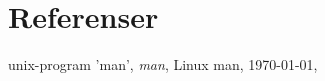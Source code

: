 \section{Referenser}
\begin{thebibliography}{999}

            unix-program 'man',
                        \emph{man},
                                        Linux man,
                                                            \today,
                                                            \end{thebibliography}
